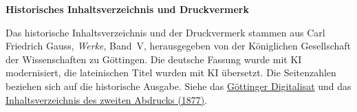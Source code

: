 \clearpage
{}
\begin{center}\textbf{Historisches Inhaltsverzeichnis und Druckvermerk}\end{center}
\noindent Das historische Inhaltsverzeichnis und der Druckvermerk stammen aus Carl Friedrich Gauss, \textit{Werke}, Band~V, herausgegeben von der Königlichen Gesellschaft der Wissenschaften zu Göttingen. Die deutsche Fassung wurde mit KI modernisiert, die lateinischen Titel wurden mit KI übersetzt. Die Seitenzahlen beziehen sich auf die historische Ausgabe. Siehe das \href{https://gdz.sub.uni-goettingen.de/id/PPN236006339}{Göttinger Digitalisat} und das \href{https://archive.org/download/Werkecarlf05gausrich/page/n652}{Inhaltsverzeichnis des zweiten Abdrucks (1877)}.
\par\medskip
